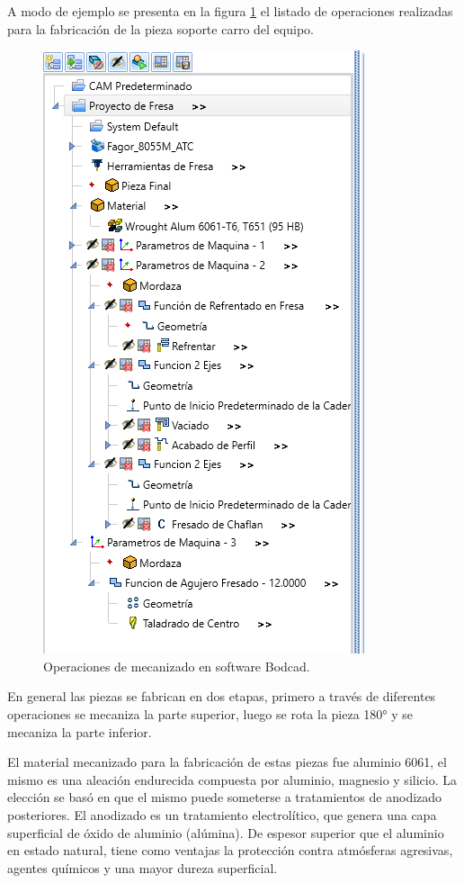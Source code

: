 A modo de ejemplo se presenta en la figura \ref{fig:estrategia} el listado de operaciones realizadas para la fabricación de la pieza soporte carro del equipo.

\begin{figure}[h]
	\centering
	\includegraphics[width=.6\textwidth]{./Figures/3d_estrategia.png}
	\caption{Operaciones de mecanizado en software Bodcad.}
	\label{fig:estrategia}
\end{figure}

En general las piezas se fabrican en dos etapas, primero a través de diferentes operaciones se mecaniza la parte superior, luego se rota la pieza 180° y se mecaniza la parte inferior.


El material mecanizado para la fabricación de estas piezas fue aluminio 6061, el mismo es una aleación endurecida compuesta por aluminio, magnesio y silicio. La elección se basó en que el mismo puede someterse a tratamientos de anodizado posteriores. El anodizado es un tratamiento electrolítico, que genera una capa superficial de óxido de aluminio (alúmina). De espesor superior que el aluminio en estado natural, tiene como ventajas la protección contra atmósferas agresivas, agentes químicos y una mayor dureza superficial.

